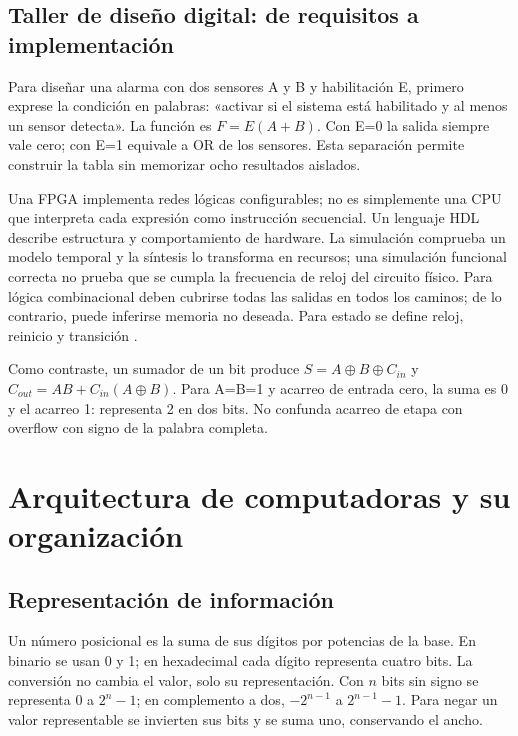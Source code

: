 \subsection{Taller de diseño digital: de requisitos a implementación}
Para diseñar una alarma con dos sensores A y B y habilitación E, primero exprese la condición en palabras: «activar si el sistema está habilitado y al menos un sensor detecta». La función es $F=E(A+B)$. Con E=0 la salida siempre vale cero; con E=1 equivale a OR de los sensores. Esta separación permite construir la tabla sin memorizar ocho resultados aislados.

Una FPGA implementa redes lógicas configurables; no es simplemente una CPU que interpreta cada expresión como instrucción secuencial. Un lenguaje HDL describe estructura y comportamiento de hardware. La simulación comprueba un modelo temporal y la síntesis lo transforma en recursos; una simulación funcional correcta no prueba que se cumpla la frecuencia de reloj del circuito físico. Para lógica combinacional deben cubrirse todas las salidas en todos los caminos; de lo contrario, puede inferirse memoria no deseada. Para estado se define reloj, reinicio y transición \cite[proyectos de lógica y memoria]{digital}.

Como contraste, un sumador de un bit produce $S=A\oplus B\oplus C_{in}$ y $C_{out}=AB+C_{in}(A\oplus B)$. Para A=B=1 y acarreo de entrada cero, la suma es 0 y el acarreo 1: representa 2 en dos bits. No confunda acarreo de etapa con overflow con signo de la palabra completa.


\section{Arquitectura de computadoras y su organización}\label{sec:h2}
\subsection{Representación de información}
Un número posicional es la suma de sus dígitos por potencias de la base. En binario se usan 0 y 1; en hexadecimal cada dígito representa cuatro bits. La conversión no cambia el valor, solo su representación. Con $n$ bits sin signo se representa $0$ a $2^n-1$; en complemento a dos, $-2^{n-1}$ a $2^{n-1}-1$. Para negar un valor representable se invierten sus bits y se suma uno, conservando el ancho.

